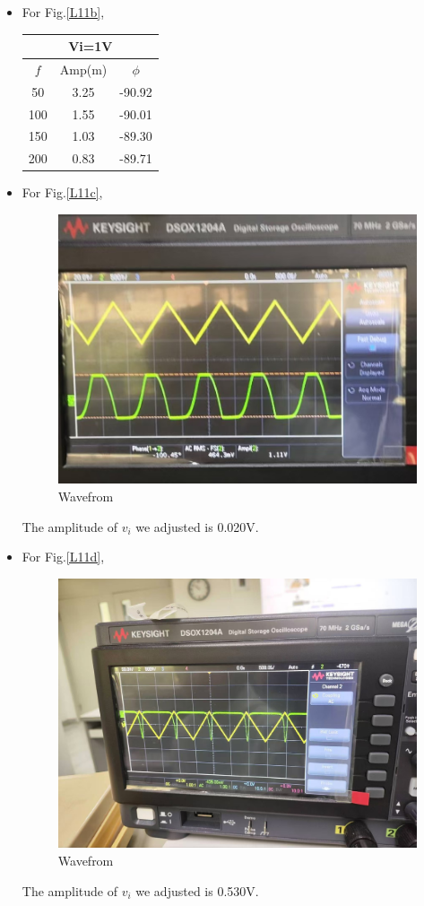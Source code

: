 \begin{itemize}
        \item For Fig.\ref{L11b},\\
\begin{table}[h]
\centering
\begin{tabular}{|ccc|}
\hline
\multicolumn{3}{|c|}{Vi=1V}                                      \\ \hline
\multicolumn{1}{|c|}{$f$} & \multicolumn{1}{c|}{Amp(m)} & $\phi$ \\ \hline
\multicolumn{1}{|c|}{50}  & \multicolumn{1}{c|}{3.25}   & -90.92 \\ \hline
\multicolumn{1}{|c|}{100} & \multicolumn{1}{c|}{1.55}   & -90.01 \\ \hline
\multicolumn{1}{|c|}{150} & \multicolumn{1}{c|}{1.03}   & -89.30 \\ \hline
\multicolumn{1}{|c|}{200} & \multicolumn{1}{c|}{0.83}   & -89.71 \\ \hline
\end{tabular}
\end{table}

        \item For Fig.\ref{L11c},\\
\begin{figure}[h]
    \centering
    \includegraphics[width=0.5\linewidth]{Lab11/l11cwf.jpg}
    \caption{Wavefrom}
    \label{fig:enter-label}
\end{figure}
\FloatBarrier
        The amplitude of $v_i$ we adjusted is 0.020V. 
        \item For Fig.\ref{L11d},\\
\begin{figure}[h]
    \centering
    \includegraphics[width=0.5\linewidth]{Lab11/l11dwf.jpg}
    \caption{Wavefrom}
    \label{l11dwf}
\end{figure}
\FloatBarrier
        The amplitude of $v_i$ we adjusted is 0.530V. 
    \end{itemize}
    
